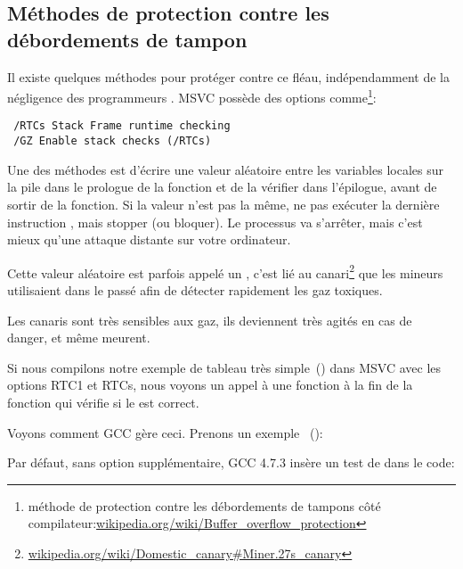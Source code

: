 \subsection{Méthodes de protection contre les débordements de tampon}
\label{subsec:BO_protection}

Il existe quelques méthodes pour protéger contre ce fléau, indépendamment de la négligence
des programmeurs \CCpp.
MSVC possède des options comme\footnote{méthode de protection contre les débordements
de tampons côté compilateur:\href{http://go.yurichev.com/17133}{wikipedia.org/wiki/Buffer\_overflow\_protection}}:

\begin{lstlisting}
 /RTCs Stack Frame runtime checking
 /GZ Enable stack checks (/RTCs)
\end{lstlisting}


Une des méthodes est d'écrire une valeur aléatoire entre les variables locales sur
la pile dans le prologue de la fonction et de la vérifier dans l'épilogue, avant de
sortir de la fonction.
Si la valeur n'est pas la même, ne pas exécuter la dernière instruction \RET, mais
stopper (ou bloquer).
Le processus va s'arrêter, mais c'est mieux qu'une attaque distante sur votre ordinateur.
    
\newcommand{\CANARYURL}{\href{http://go.yurichev.com/17134}{wikipedia.org/wiki/Domestic\_canary\#Miner.27s\_canary}}


Cette valeur aléatoire est parfois appelé un , c'est lié au canari\footnote{\CANARYURL}
que les mineurs utilisaient dans le passé afin de détecter rapidement les gaz toxiques.

Les canaris sont très sensibles aux gaz, ils deviennent très agités en cas de danger,
et même meurent.

Si nous compilons notre exemple de tableau très simple~() dans
\ac{MSVC} avec les options RTC1 et RTCs, nous voyons un appel à 
une fonction à la fin de la fonction qui vérifie si le  est correct.

Voyons comment GCC gère ceci.
Prenons un exemple ~():



Par défaut, sans option supplémentaire, GCC 4.7.3 insère un test de   dans
le code:

